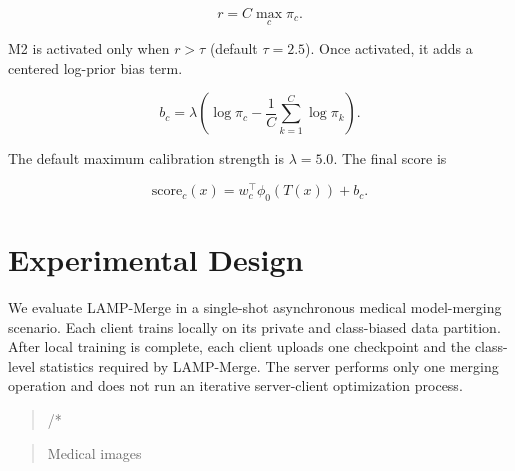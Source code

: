 \documentclass[letterpaper]{article}
\begin{document}
\begin{equation}
r=C\max_c \pi_c.
\end{equation}

M2 is activated only when $r>\tau$ (default $\tau=2.5$). Once activated, it adds a centered log-prior bias term.


\begin{equation}
b_c=\lambda\left(\log \pi_c-\frac{1}{C}\sum_{k=1}^{C}\log \pi_k\right).
\end{equation}

The default maximum calibration strength is $\lambda=5.0$. The final score is


\begin{equation}
\mathrm{score}_c(x)=w_c^\top\phi_0(T(x))+b_c.
\end{equation}

\section{Experimental Design}

We evaluate LAMP-Merge in a single-shot asynchronous medical model-merging scenario. Each client trains locally on its private and class-biased data partition. After local training is complete, each client uploads one checkpoint and the class-level statistics required by LAMP-Merge. The server performs only one merging operation and does not run an iterative server-client optimization process.


\begin{quote}\small /*\end{quote}

\begin{quote}\small Medical images\end{quote}
\end{document}
